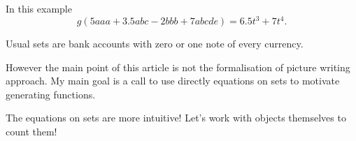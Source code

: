 \documentclass{article}
\begin{document}
In this example
\[
g(5 aaa + 3.5 abc - 2 bbb + 7 abcde) = 6.5 t^3  + 7 t^4.
\]

Usual sets are bank accounts with zero or one note of every currency. 

However the main point of this article is not the formalisation of picture writing approach.
My main goal is a call to use directly equations on sets to motivate generating functions. 


The equations on sets are more intuitive! 
Let's work with objects themselves to count them! 














\end{document}
